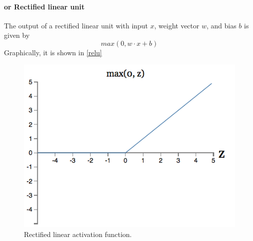 \paragraph{ or {Rectified linear unit}} The output of a rectified linear unit with input $x$, weight vector $w$, and bias $b$ is given by
\begin{equation}
max(0, w\cdot x+b)
\end{equation}
Graphically, it is shown in \autoref{relu}
\begin{figure}
\centering
\includegraphics[scale=0.6]{img/relu}
\caption{Rectified linear activation function.}
\label{relu}
\end{figure}
